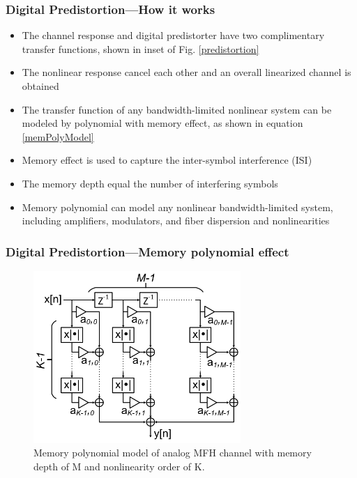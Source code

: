 \documentclass[t]{beamer}
\begin{document}
\begin{frame}
    \frametitle{Digital Predistortion---How it works}
    \begin{itemize}
        \item The channel response and digital predistorter have two complimentary transfer functions, shown in inset of Fig. \ref{predistortion}
        \item The nonlinear response cancel each other and an overall linearized channel is obtained
        \item The transfer function of any bandwidth-limited nonlinear system can be modeled by polynomial with memory effect, as shown in equation \ref{memPolyModel}
        \item Memory effect is used to capture the inter-symbol interference (ISI)
        \item The memory depth equal the number of interfering symbols 
        \item Memory polynomial can model any nonlinear bandwidth-limited system, including amplifiers, modulators, and fiber dispersion and nonlinearities
    \end{itemize}
    
    
\end{frame}

\begin{frame}
    \frametitle{Digital Predistortion---Memory polynomial effect}
    \begin{figure}
        \includegraphics[width=0.7\textwidth]{memory-polynomial.PNG}
        \caption{Memory polynomial model of analog MFH channel with memory depth of M and nonlinearity order of K.}
        \label{memorypolynomial}
    \end{figure}
\end{frame}
\end{document}
